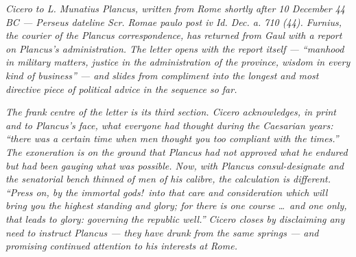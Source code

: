 
\textit{Cicero to L. Munatius Plancus, written from Rome
shortly after 10 December 44 BC --- Perseus dateline
\textit{Scr. Romae paulo post iv Id. Dec. a. 710 (44)}.
Furnius, the courier of the Plancus correspondence, has
returned from Gaul with a report on Plancus's
administration. The letter opens with the report
itself --- ``manhood in military matters, justice in the
administration of the province, wisdom in every kind of
business'' --- and slides from compliment into the longest
and most directive piece of political advice in the
sequence so far.}

\textit{The frank centre of the letter is its third
section. Cicero acknowledges, in print and to Plancus's
face, what everyone had thought during the Caesarian
years: ``there was a certain time when men thought you too
compliant with the times.'' The exoneration is on the
ground that Plancus had not approved what he endured but
had been gauging what was possible. Now, with Plancus
consul-designate and the senatorial bench thinned of men
of his calibre, the calculation is different. ``Press on,
by the immortal gods!\ into that care and consideration
which will bring you the highest standing and glory; for
there is one course \dots\ and one only, that leads to
glory: governing the republic well.'' Cicero closes by
disclaiming any need to instruct Plancus --- they have
drunk from the same springs --- and promising continued
attention to his interests at Rome.}
